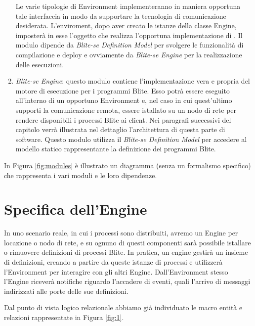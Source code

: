 \begin{enumerate}
	Le varie tipologie di Environment implementeranno in maniera opportuna tale
	interfaccia in modo da supportare la tecnologia di comunicazione desiderata.
	L'enviroment, dopo aver creato le istanze della classe Engine, imposterà in
	esse l'oggetto che realizza l'opportuna implementazione di
	. Il modulo dipende da \emph{Blite-se Definition Model}
	per svolgere le funzionalità di compilazione e deploy e ovviamente da
	\emph{Blite-se Engine} per la realizzazione delle esecuzioni.
	
  \item \emph{Blite-se Engine}: questo modulo contiene l'implementazione vera
  e propria del motore di esecuzione per i programmi Blite. Esso potrà essere
  eseguito all'interno di un opportuno Environment e, nel caso in cui
  quest'ultimo supporti la comunicazione remota, essere istallato su un nodo di
  rete per rendere disponibili i processi Blite ai client. Nei
  paragrafi successivi del capitolo verrà illustrata nel dettaglio
  l'architettura di questa parte di software. Questo modulo utilizza il
  \emph{Blite-se Definition Model} per accedere al modello statico
  rappresentante la definizione dei programmi Blite.
  
\end{enumerate}

In Figura \ref{fig:modules} è illustrato un diagramma (senza un
formalismo specifico) che rappresenta i vari moduli e le loro dipendenze.
\newpage

\section{Specifica dell'Engine}

In uno scenario reale, in cui i processi sono distribuiti, avremo un Engine per
locazione o nodo di rete, e su ognuno di questi componenti sarà possibile
istallare o rimuovere definizioni di processi Blite. In pratica, un engine
gestir\`a un insieme di definizioni, creando a partire da queste istanze di
processi e utilizzerà l'Environment per interagire con gli altri Engine. 
Dall'Environment stesso l'Engine riceverà notifiche riguardo l'accadere di
eventi, quali l'arrivo di messaggi indirizzati alle porte delle sue definizioni.

Dal punto di vista logico relazionale abbiamo già individuato le
macro entità e relazioni rappresentate in Figura \ref{fig:1}.

